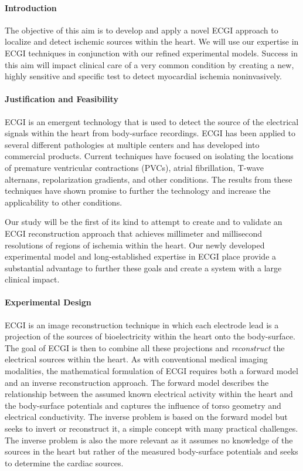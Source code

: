  \paragraph{Introduction} The objective of this aim is to develop and apply a novel ECGI approach to
localize and detect ischemic sources within the heart. We will use our
expertise in ECGI techniques in conjunction with our refined experimental
models. Success in this aim will impact clinical care of a very common
condition by creating a new, highly sensitive and specific test to detect
myocardial ischemia noninvasively.

\paragraph{Justification and Feasibility}
 ECGI is an emergent technology that
 is used to detect the source of the electrical signals within the heart
 from body-surface recordings.
ECGI has been applied to several different pathologies at multiple centers
and has developed into commercial products. Current techniques have focused
on isolating the locations of premature ventricular contractions (PVCs), atrial
fibrillation, T-wave alternans, repolarization gradients, and other
conditions.\cite{BLZ:Pot2014,BLZ:Dub2015,BLZ:Wan2016a,RSM:Sha2015,BLZ:Wan2018}
The results from these techniques have shown promise to further the
technology and increase the applicability to other conditions.

Our study will be the first of its kind to attempt to create and to
validate an ECGI reconstruction approach that achieves millimeter and
millisecond resolutions of regions of ischemia within the heart. Our newly
developed experimental model and long-established expertise in ECGI place
provide a substantial advantage to further these goals and create a system
with a large clinical impact.


\paragraph{Experimental Design} ECGI is an image reconstruction technique in
which each electrode lead is a projection of the sources of bioelectricity
within the heart onto the body-surface.\cite{RSM:Mes86,RSM:Pul2010} The
goal of ECGI is then to combine all these projections and
\emph{reconstruct} the electrical sources within the heart. As with
conventional medical imaging modalities, the mathematical formulation of
ECGI requires both a forward model and an inverse reconstruction
approach. The forward model describes the relationship between the assumed
known electrical activity within the heart and the body-surface potentials
and captures the influence of torso geometry and electrical
conductivity.\cite{RSM:Mac2010b} The inverse problem is based on the
forward model but seeks to invert or reconstruct it, a simple concept with
many practical challenges.  The inverse problem is also the more relevant
as it assumes no knowledge of the sources in the heart but rather of the
measured body-surface potentials and seeks to determine the cardiac
sources.\cite{RSM:Mes86,RSM:Pul2010}

